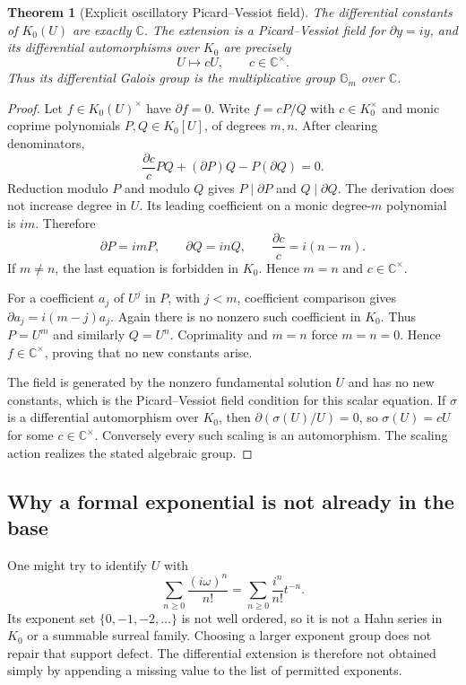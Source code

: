 \documentclass[11pt,a4paper]{article}
\newtheorem{theorem}{Theorem}[section]
\theoremstyle{definition}
\newcommand{\C}{\mathbb C}
\newcommand{\D}{\partial}
\numberwithin{equation}{section}
\begin{document}
\begin{theorem}[Explicit oscillatory Picard--Vessiot field]
\label{thm:PV}
The differential constants of $K_0(U)$ are exactly $\C$. The extension is
a Picard--Vessiot field for $\D y=iy$, and its differential automorphisms
over $K_0$ are precisely
\[
 U\longmapsto cU,\qquad c\in\C^\times.
\]
Thus its differential Galois group is the multiplicative group
$\mathbb G_m$ over $\C$.
\end{theorem}
\begin{proof}
Let $f\in K_0(U)^\times$ have $\D f=0$. Write
$f=cP/Q$ with $c\in K_0^\times$ and monic coprime polynomials
$P,Q\in K_0[U]$, of degrees $m,n$. After clearing denominators,
\[
 \frac{\D c}{c}PQ+(\D P)Q-P(\D Q)=0.
\]
Reduction modulo $P$ and modulo $Q$ gives $P\mid\D P$ and
$Q\mid\D Q$. The derivation does not increase degree in $U$. Its leading
coefficient on a monic degree-$m$ polynomial is $im$. Therefore
\[
 \D P=imP,\qquad\D Q=inQ,\qquad
 \frac{\D c}{c}=i(n-m).
\]
If $m\ne n$, the last equation is forbidden in $K_0$. Hence $m=n$ and
$c\in\C^\times$.

For a coefficient $a_j$ of $U^j$ in $P$, with $j<m$, coefficient
comparison gives
$\D a_j=i(m-j)a_j$. Again there is no nonzero such coefficient in
$K_0$. Thus $P=U^m$ and similarly $Q=U^n$. Coprimality and $m=n$ force
$m=n=0$. Hence $f\in\C^\times$, proving that no new constants arise.

The field is generated by the nonzero fundamental solution $U$ and has
no new constants, which is the Picard--Vessiot field condition for this
scalar equation. If $\sigma$ is a differential automorphism over $K_0$,
then $\D(\sigma(U)/U)=0$, so $\sigma(U)=cU$ for some
$c\in\C^\times$. Conversely every such scaling is an automorphism.
The scaling action realizes the stated algebraic group.
\end{proof}

\subsection{Why a formal exponential is not already in the base}
One might try to identify $U$ with
\[
 \sum_{n\ge0}\frac{(i\omega)^n}{n!}
 =\sum_{n\ge0}\frac{i^n}{n!}t^{-n}.
\]
Its exponent set $\{0,-1,-2,\ldots\}$ is not well ordered, so it is not a
Hahn series in $K_0$ or a summable surreal family. Choosing a larger
exponent group does not repair that support defect. The differential
extension is therefore not obtained simply by appending a missing value
to the list of permitted exponents.
\end{document}
